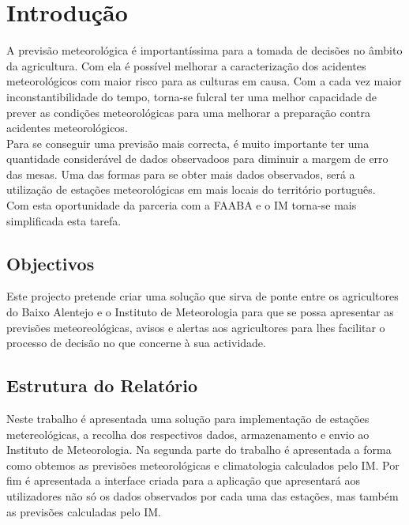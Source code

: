 \chapter{Introdução}
A previsão meteorológica é importantíssima para a tomada de decisões no âmbito da agricultura. Com ela é possível melhorar a caracterização dos acidentes meteorológicos com maior risco para as culturas em causa. 
Com a cada vez maior inconstantibilidade do tempo, torna-se fulcral ter uma melhor capacidade de prever as condições meteorológicas para uma melhorar a preparação contra acidentes meteorológicos.
\\Para se conseguir uma previsão mais correcta, é muito importante ter uma quantidade considerável de dados observadoos para diminuir a margem de erro das mesas. Uma das formas para se obter mais dados observados, será a utilização de estações meteorológicas em mais locais do território português.
\\Com esta oportunidade da parceria com a FAABA e o IM torna-se mais simplificada esta tarefa.
 

\section{Objectivos}
Este projecto pretende criar uma solução que sirva de ponte entre os agricultores do Baixo Alentejo e o Instituto de Meteorologia para que se possa apresentar as previsões meteoreológicas, avisos e alertas aos agricultores para lhes facilitar o processo de decisão no que concerne à sua actividade.

\section{Estrutura do Relatório}
Neste trabalho é apresentada uma solução para implementação de estações metereológicas, a recolha dos respectivos dados, armazenamento e envio ao Instituto de Meteorologia.
Na segunda parte do trabalho é apresentada a forma como obtemos as previsões meteorológicas e climatologia calculados pelo IM.
Por fim é apresentada a interface criada para a aplicação que apresentará aos utilizadores não só os dados observados por cada uma das estações, mas também as previsões calculadas pelo IM.